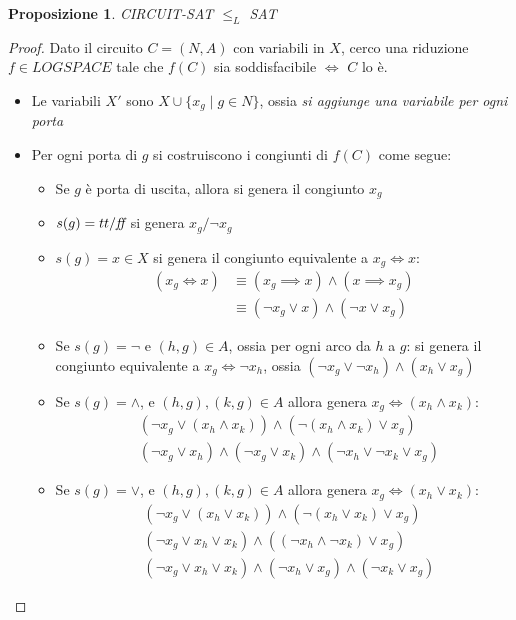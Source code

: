 \documentclass[a4paper,10pt,oneside]{article}
\theoremstyle{break}
\newtheorem{prop}{Proposizione}[subsection]
\begin{document}
\begin{mdframed}
 
\begin{prop}
CIRCUIT-SAT $\leq_L$ SAT 
\end{prop}

\begin{proof}
 Dato il circuito $C = (N, A)$ con variabili in $X$, cerco una riduzione $f \in LOGSPACE$ tale che $f(C)$ sia soddisfacibile $\iff$ $C$ lo è.

 \begin{itemize}
  \item Le variabili $X'$ sono $X \cup \{ x_g \mid g \in N\}$, ossia \emph{si aggiunge una variabile per ogni porta}
  \item Per ogni porta di $g$ si costruiscono i congiunti di $f(C)$ come segue:
  \begin{itemize}
   \item Se $g$ è porta di uscita, allora si genera il congiunto $x_g$
   \item $s(g) = tt/\emph{ff}$ si genera $x_g/\neg x_g$
   \item $s(g) = x \in X$ si genera il congiunto equivalente a $x_g \iff x$:
   \[\begin{aligned}
      (x_g \iff x) & \equiv (x_g \implies x) \wedge (x \implies x_g)\\
      & \equiv (\neg x_g \vee x) \wedge (\neg x \vee x_g)
     \end{aligned}\]
   \item Se $s(g) = \neg$ e $(h, g) \in A$, ossia per ogni arco da $h$ a $g$: si genera il congiunto equivalente a $x_g \iff \neg x_h$, ossia $(\neg x_g \vee \neg x_h) \wedge (x_h \vee x_g)$
   \item Se $s(g) = \wedge$, e $(h, g), (k, g) \in A$ allora genera $x_g \iff (x_h \wedge x_k)$:
   \[\begin{aligned}
   &(\neg x_g \vee (x_h \wedge x_k)) \wedge (\neg (x_h \wedge x_k) \vee x_g ) \\
   &(\neg x_g \vee x_h) \wedge (\neg x_g \vee x_k) \wedge (\neg x_h \vee \neg x_k \vee x_g)
   \end{aligned}\]
   \item Se $s(g) = \vee$, e $(h, g), (k, g) \in A$ allora genera $x_g \iff (x_h \vee x_k)$:
   \[\begin{aligned}
   &(\neg x_g \vee (x_h \vee x_k)) \wedge (\neg (x_h \vee x_k) \vee x_g ) \\
   &(\neg x_g \vee x_h \vee x_k) \wedge ((\neg x_h \wedge \neg x_k) \vee x_g )\\
   &(\neg x_g \vee x_h \vee x_k) \wedge (\neg x_h \vee x_g) \wedge (\neg x_k \vee x_g)
   \end{aligned}\]
  \end{itemize}
 \end{itemize}


\end{proof}
\end{mdframed}
\end{document}
